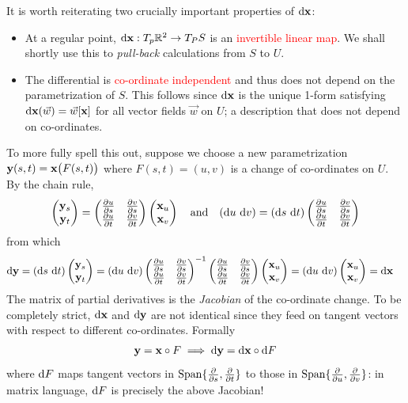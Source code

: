It is worth reiterating two crucially important properties of $\dvx$:
\begin{itemize}
  \item At a regular point, $\dvx:T_p\R^2\to T_PS$ is an \textcolor{red}{invertible linear map}. We shall shortly use this to \emph{pull-back} calculations from $S$ to $U$.
  \item The differential is \textcolor{red}{co-ordinate independent} and thus does not depend on the parametrization of $S$. This follows since $\dvx$ is the unique 1-form satisfying $\dvx(\vec w)=\vec w[\vx]$ for all vector fields $\vec w$ on $U$; a description that does not depend on co-ordinates.
\end{itemize}


\begin{aside}\label{aside:coc}
	\quad To more fully spell this out, suppose we choose a new parametrization $\vy(s,t)=\vx\bigl(F(s,t)\bigr)$ where $F(s,t)=(u,v)$ is a change of co-ordinates on $U$. By the chain rule,
	\[
		\twovec{\vy_s}{\vy_t}=
		\begin{pmatrix}
			\partials[u]{s}&\partials[v]{s}\\
			\partials[u]{t}&\partials[v]{t}
		\end{pmatrix}
		\twovec{\vx_u}{\vx_v} \quad\text{and}\quad
		(\du\ \dv)=(\ds\ \dt)
		\begin{pmatrix}
			\partials[u]{s}&\partials[v]{s}\\
			\partials[u]{t}&\partials[v]{t}
		\end{pmatrix}
	\]
	from which
	\begin{align*}
		\D\vy&=(\ds\ \dt)\twovec{\vy_s}{\vy_t} =(\du\ \dv)
		\begin{pmatrix}
			\partials[u]{s}&\partials[v]{s}\\
			\partials[u]{t}&\partials[v]{t}
		\end{pmatrix}^{-1}
		\begin{pmatrix}
			\partials[u]{s}&\partials[v]{s}\\
			\partials[u]{t}&\partials[v]{t}
		\end{pmatrix}
		\twovec{\vx_u}{\vx_v} =(\du\ \dv)\twovec{\vx_u}{\vx_v}=\dvx
	\end{align*}
	The matrix of partial derivatives is the \emph{Jacobian} of the co-ordinate change.
	\smallbreak
	To be completely strict, $\dvx$ and $\D\vy$ are not identical since they feed on tangent vectors with respect to different co-ordinates. Formally
	\[
		\vy=\vx\circ F\implies\D\vy=\dvx\circ\D F
	\]
	where $\D F$ maps tangent vectors in $\Span\{\partials s,\partials t\}$ to those in $\Span\{\partials u,\partials v\}$: in matrix language, $\D F$ is precisely the above Jacobian!
\end{aside}


